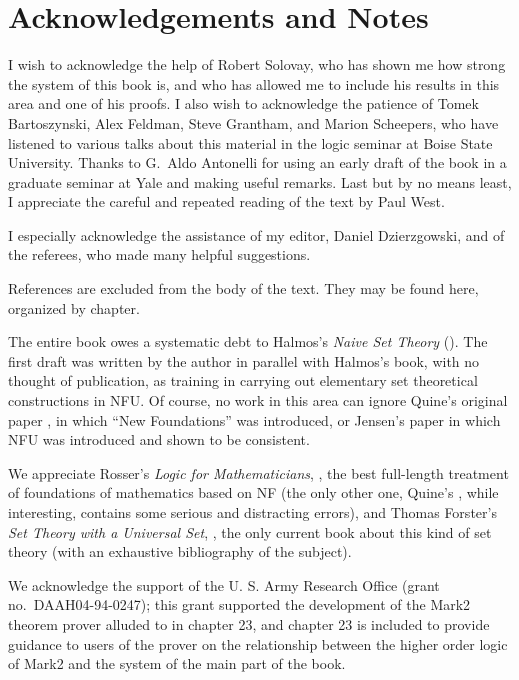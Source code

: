 \chapter{Acknowledgements and Notes}\label{chap-notes}

I wish to acknowledge the help of Robert Solovay, who has shown me how
strong the system of this book is, and who has allowed me to include
his results in this area and one of his proofs.  I also wish to
acknowledge the patience of Tomek Bartoszynski, Alex Feldman, Steve
Grantham, and Marion Scheepers, who have listened to various talks
about this material in the logic seminar at Boise State University.
Thanks to G.~Aldo Antonelli for using an early draft of the book in a
graduate seminar at Yale and making useful remarks.  Last but by no
means least, I appreciate the careful and repeated reading of the text
by Paul West.

I especially acknowledge the assistance of my editor, Daniel
Dzierzgowski, and of the referees, who made many helpful suggestions.

References are excluded from the body of the text.  They may be found
here, organized by chapter.

The entire book owes a systematic debt to Halmos's {\itshape Naive Set
Theory\/} (\cite{halmos}).  The first draft was written by the author
in parallel with Halmos's book, with no thought of publication, as
training in carrying out elementary set theoretical constructions in
NFU.  Of course, no work in this area can ignore Quine's
original paper \cite{quine}, in which ``New Foundations'' was introduced, or Jensen's paper \cite{jensen} in which
NFU was 
introduced and shown to be consistent.

We appreciate Rosser's {\itshape Logic for Mathematicians},
\cite{rosser}, the best full-length treatment of foundations of
mathematics based on NF (the only other one, Quine's
\cite{ml}, while interesting, contains some serious and distracting
errors), and Thomas Forster's {\itshape Set Theory with a Universal Set},
\cite{forster}, the only current book about this kind of set theory 
(with an exhaustive bibliography of the subject).

We acknowledge the support of the U. S. Army Research Office (grant
no.~DAAH04-94-0247); this grant supported the development of the Mark2
theorem prover alluded to in chapter 23, and chapter 23 is included to
provide guidance to users of the prover on the relationship between
the higher order logic of Mark2 and the system of the main part of the
book.

